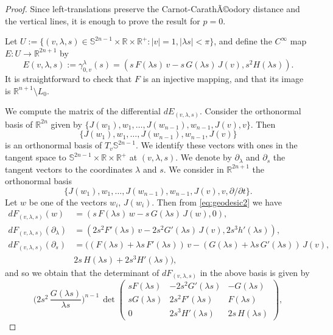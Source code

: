 \documentclass[10pt]{amsart}
\theoremstyle{definition}
\theoremstyle{remark}
\numberwithin{equation}{section}
\begin{document}
\begin{proof}
Since left-translations preserve the Carnot-CarathÃ©odory distance and 
the vertical lines, it is enough to prove the result for $p=0$.

Let $U:=\{(v,{\lambda},s)\in{{\mathbb{S}}}^{2n-1}\times{{\mathbb{R}}}\times{{\mathbb{R}}}^+ : |v|=1,
|{\lambda} s|<\pi\}$, and define the $C^\infty$ map $E:U\to{{\mathbb{R}}}^{2n+1}$ by
\[
E(v,{\lambda},s):={\gamma}_{0,v}^{\lambda}(s)=(s\,F({\lambda} s)\,v-s\,G({\lambda} s)\,J(v), s^2 
H({\lambda} s)).
\]
It is straightforward to check that $F$ is an injective mapping, and
that its image is ${{\mathbb{R}}}^{n+1}\setminus L_{0}$.

We compute the matrix of the differential $dE_{(v,{\lambda},s)}$. Consider
the orthonormal basis of ${{\mathbb{R}}}^{2n}$ given by
$\{J(w_{1}),w_{1},\ldots,J(w_{n-1}),w_{n-1},J(v),v\}$. Then
\[
\{J(w_{1}),w_{1},\ldots,J(w_{n-1}),w_{n-1},J(v)\}
\]
is an orthonormal 
basis of $T_{v}{{\mathbb{S}}}^{2n-1}$. We identify these vectors with ones in
the tangent space to ${{\mathbb{S}}}^{2n-1}\times{{\mathbb{R}}}\times{{\mathbb{R}}}^+$ at $(v,{\lambda},s)$.
We denote by ${\partial}_{\lambda}$ and ${\partial}_{s}$ the tangent vectors to
the coordinates ${\lambda}$ and $s$. We consider in ${{\mathbb{R}}}^{2n+1}$ the
orthonormal basis
\[
\{J(w_{1}),w_{1},\ldots,J(w_{n-1}),w_{n-1},J(v),v,{\partial}/{\partial} t\}.
\]
Let $w$ be one of the vectors $w_{i}$, $J(w_{i})$. Then from \eqref{eq:geodesic2} we have
\begin{align*}
dF_{(v,{\lambda},s)}(w)&=(s\,F({\lambda} s)\,w-s\,G({\lambda} s)\,J(w),0),
\\
dF_{(v,{\lambda},s)}({\partial}_{\lambda})&=(2s^2 F'({\lambda} s)\,v-2s^2 G'({\lambda} s)\,J(v),
2s^3 h'({\lambda} s)),
\\
dF_{(v,{\lambda},s)}({\partial}_{s})&=((F({\lambda} s)+{\lambda} s\,F'({\lambda} s))\,v
-(G({\lambda} s)+{\lambda} s\,G'({\lambda} s))\,J(v),
\\
&2s\,H({\lambda} s)+2s^3 H'({\lambda}
s)),
\end{align*}
and so we obtain that the determinant of $dF_{(v,{\lambda},s)}$ in the above
basis is given by
\[
\bigg(2s^2\,\frac{G({\lambda} s)}{{\lambda} s}\bigg)^{n-1}\,
\det
\begin{pmatrix}
s F({\lambda} s) & -2 s^2 G'({\lambda} s) & -G({\lambda} s)
\\
s G({\lambda} s) & 2s^2 F'({\lambda} s) & F({\lambda} s)
\\
0 & 2 s^3 H'({\lambda} s) & 2s\,H({\lambda} s)
\end{pmatrix},
\]
\end{proof}
\end{document}
